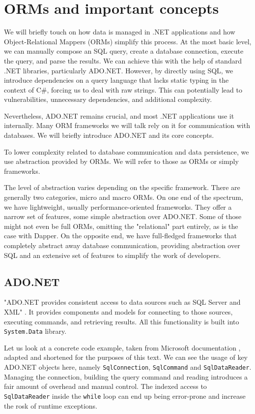 \section{ORMs and important concepts}

We will briefly touch on how data is managed in .NET applications and how Object-Relational Mappers (ORMs) simplify this process.
At the most basic level, we can manually compose an SQL query, create a database connection, execute the query, and parse the results. We can achieve this with the help of standard .NET libraries, particularly ADO.NET. However, by directly using SQL, we introduce dependencies on a query language that lacks static typing in the context of C\#, forcing us to deal with raw strings. This can potentially lead to vulnerabilities, unnecessary dependencies, and additional complexity.

Nevertheless, ADO.NET remains crucial, and most .NET applications use it internally. Many ORM frameworks we will talk rely on it for communication with databases. We will briefly introduce ADO.NET and its core concepts.

To lower complexity related to database communication and data persistence, we use abstraction provided by ORMs. We will refer to those as ORMs or simply frameworks.

The level of abstraction varies depending on the specific framework. There are generally two categories, micro and macro ORMs. On one end of the spectrum, we have lightweight, usually performance-oriented frameworks. They offer a narrow set of features, some simple abstraction over ADO.NET. Some of those might not even be full ORMs, omitting the "relational" part entirely, as is the case with Dapper\cite{Dapper}. On the opposite end, we have full-fledged frameworks that completely abstract away database communication, providing abstraction over SQL and an extensive set of features to simplify the work of developers. \cite{Dapper}

\subsection{ADO.NET}
"ADO.NET provides consistent access to data sources such as SQL Server and XML" \cite{ADONET}. It provides components and models for connecting to those sources, executing commands, and retrieving results. All this functionality is built into \texttt{System.Data} library.

Let us look at a concrete code example, taken from Microsoft documentation \cite{ADONET}, adapted and shortened for the purposes of this text.
We can see the usage of key ADO.NET objects here, namely \texttt{SqlConnection}, \texttt{SqlCommand} and \texttt{SqlDataReader}. Managing the connection, building the query command and reading introduces a fair amount of overhead and manual control. The indexed access to \texttt{SqlDataReader} inside the \texttt{while} loop can end up being error-prone and increase the rosk of runtime exceptions. 

